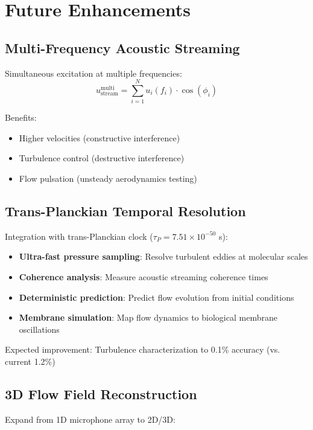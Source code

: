 \documentclass[12pt,a4paper]{article}
\begin{document}
\section{Future Enhancements}

\subsection{Multi-Frequency Acoustic Streaming}

Simultaneous excitation at multiple frequencies:
\begin{equation}
u_{\text{stream}}^{\text{multi}} = \sum_{i=1}^{N} u_i(f_i) \cdot \cos(\phi_i)
\end{equation}

Benefits:
\begin{itemize}
\item Higher velocities (constructive interference)
\item Turbulence control (destructive interference)
\item Flow pulsation (unsteady aerodynamics testing)
\end{itemize}

\subsection{Trans-Planckian Temporal Resolution}

Integration with trans-Planckian clock ($\tau_P = 7.51 \times 10^{-50}$ s):

\begin{itemize}
\item \textbf{Ultra-fast pressure sampling}: Resolve turbulent eddies at molecular scales
\item \textbf{Coherence analysis}: Measure acoustic streaming coherence times
\item \textbf{Deterministic prediction}: Predict flow evolution from initial conditions
\item \textbf{Membrane simulation}: Map flow dynamics to biological membrane oscillations
\end{itemize}

Expected improvement: Turbulence characterization to 0.1\% accuracy (vs. current 1.2\%)

\subsection{3D Flow Field Reconstruction}

Expand from 1D microphone array to 2D/3D:
\end{document}
